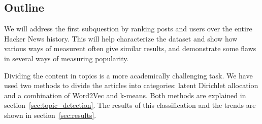 \subsection{Outline}
We will address the first subquestion by ranking posts and users over the entire Hacker News history. This will help characterize the dataset and show how various ways of measurent often give similar results, and demonstrate some flaws in several ways of measuring popularity.

Dividing the content in topics is a more academically challenging task. We have used two methods to divide the articles into categories: latent Dirichlet allocation and a combination of Word2Vec and k-means. Both methods are explained in section~\ref{sec:topic_detection}. The results of this classification and the trends are shown in section~\ref{sec:results}.